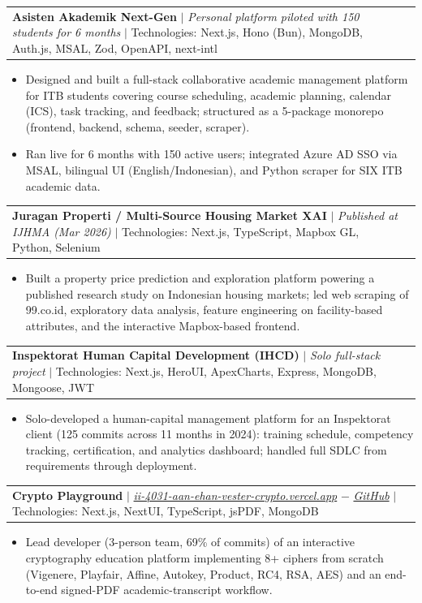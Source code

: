 \documentclass[letterpaper,11pt]{article}
\makeatletter
\newcommand{\resumeItem}[1]{
  \item\small{
    {#1 \vspace{-2pt}}
  }
}
\newcommand{\resumeProjectHeading}[2]{
    \vspace{-2pt}\item
    \begin{tabularx}{0.97\textwidth}{X@{\extracolsep{\fill}}r}
      \small#1 & #2 \\
    \end{tabularx}\vspace{-7pt}
}
\newcommand{\resumeItemListStart}{\begin{itemize}}
\newcommand{\resumeItemListEnd}{\end{itemize}\vspace{-5pt}}
\makeatother
\begin{document}
    \resumeProjectHeading
        {\textbf{Asisten Akademik Next-Gen} $|$
        \emph{Personal platform piloted with 150 students for 6 months} $|$
        Technologies: Next.js, Hono (Bun), MongoDB, Auth.js, MSAL, Zod, OpenAPI, next-intl}{}
        \resumeItemListStart
            \resumeItem{Designed and built a full-stack collaborative academic management platform for ITB students covering course scheduling, academic planning, calendar (ICS), task tracking, and feedback; structured as a 5-package monorepo (frontend, backend, schema, seeder, scraper).}
            \resumeItem{Ran live for 6 months with 150 active users; integrated Azure AD SSO via MSAL, bilingual UI (English/Indonesian), and Python scraper for SIX ITB academic data.}
        \resumeItemListEnd

    \resumeProjectHeading
        {\textbf{Juragan Properti / Multi-Source Housing Market XAI} $|$
        \emph{Published at IJHMA (Mar 2026)} $|$
        Technologies: Next.js, TypeScript, Mapbox GL, Python, Selenium}{}
        \resumeItemListStart
            \resumeItem{Built a property price prediction and exploration platform powering a published research study on Indonesian housing markets; led web scraping of 99.co.id, exploratory data analysis, feature engineering on facility-based attributes, and the interactive Mapbox-based frontend.}
        \resumeItemListEnd

    \resumeProjectHeading
        {\textbf{Inspektorat Human Capital Development (IHCD)} $|$
        \emph{Solo full-stack project} $|$
        Technologies: Next.js, HeroUI, ApexCharts, Express, MongoDB, Mongoose, JWT}{}
        \resumeItemListStart
            \resumeItem{Solo-developed a human-capital management platform for an Inspektorat client (125 commits across 11 months in 2024): training schedule, competency tracking, certification, and analytics dashboard; handled full SDLC from requirements through deployment.}
        \resumeItemListEnd

    \resumeProjectHeading
        {\textbf{Crypto Playground} $|$
        \emph{\href{https://ii-4031-aan-ehan-vester-crypto.vercel.app}{\color{blue}ii-4031-aan-ehan-vester-crypto.vercel.app}} $-$ \emph{\href{https://github.com/Asweh-Debrej/II4031-aan-ehan-vester-crypto}{\color{blue}GitHub}} $|$
        Technologies: Next.js, NextUI, TypeScript, jsPDF, MongoDB}{}
        \resumeItemListStart
            \resumeItem{Lead developer (3-person team, 69\% of commits) of an interactive cryptography education platform implementing 8+ ciphers from scratch (Vigenere, Playfair, Affine, Autokey, Product, RC4, RSA, AES) and an end-to-end signed-PDF academic-transcript workflow.}
        \resumeItemListEnd
\end{document}
